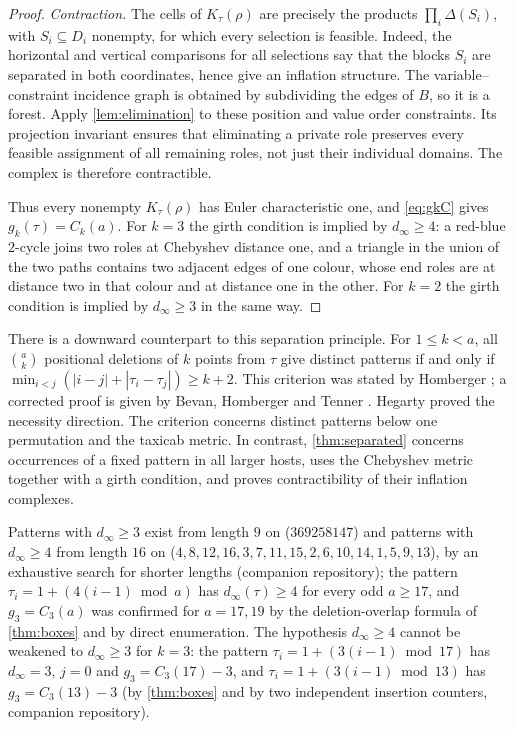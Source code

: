 \documentclass[11pt,reqno]{amsart}
\theoremstyle{plain}
\theoremstyle{definition}
\theoremstyle{remark}
\begin{document}
\begin{proof}
\emph{Contraction.} The cells of $K_\tau(\rho)$ are precisely the
products $\prod_i\Delta(S_i)$, with $S_i\subseteq D_i$ nonempty,
for which every selection is feasible. Indeed, the horizontal and
vertical comparisons for all selections say that the blocks $S_i$
are separated in both coordinates, hence give an inflation structure.
The variable--constraint incidence graph is obtained by subdividing
the edges of $B$, so it is a forest. Apply \cref{lem:elimination} to
these position and value order constraints. Its projection invariant
ensures that eliminating a private role preserves every feasible
assignment of all remaining roles, not just their individual domains.
The complex is therefore contractible.

Thus every nonempty $K_\tau(\rho)$ has Euler characteristic one, and \eqref{eq:gkC} gives $g_k(\tau)=C_k(a)$. For $k=3$ the girth condition is implied by $d_\infty\ge4$: a red-blue $2$-cycle joins two roles at Chebyshev distance one, and a triangle in the union of the two paths contains two adjacent edges of one colour, whose end roles are at distance two in that colour and at distance one in the other. For $k=2$ the girth condition is implied by $d_\infty\ge3$ in the same way.
\end{proof}

There is a downward counterpart to this separation principle.
For $1\le k<a$, all $\binom ak$ positional deletions of $k$ points
from $\tau$ give distinct patterns if and only if
$\min_{i<j}(|i-j|+|\tau_i-\tau_j|)\ge k+2$.
This criterion was stated by Homberger \cite[preprint, Thm.~19]{Homberger2012};
a corrected proof is given by Bevan, Homberger and Tenner
\cite[preprint, Thm.~2.25]{BHT2018}. Hegarty \cite{Hegarty2013} proved the
necessity direction. The criterion concerns distinct patterns below one
permutation and the taxicab metric. In contrast, \cref{thm:separated}
concerns occurrences of a fixed pattern in all larger hosts, uses the
Chebyshev metric together with a girth condition, and proves
contractibility of their inflation complexes.

Patterns with $d_\infty\ge3$ exist from length $9$ on ($369258147$) and patterns with $d_\infty\ge4$ from length $16$ on ($4,8,12,16,3,7,11,15,2,6,10,14,1,5,9,13$), by an exhaustive search for shorter lengths (companion repository); the pattern $\tau_i=1+(4(i-1)\bmod a)$ has $d_\infty(\tau)\ge4$ for every odd $a\ge17$, and $g_3=C_3(a)$ was confirmed for $a=17,19$ by the deletion-overlap formula of \cref{thm:boxes} and by direct enumeration. The hypothesis $d_\infty\ge4$ cannot be weakened to $d_\infty\ge3$ for $k=3$: the pattern $\tau_i=1+(3(i-1)\bmod 17)$ has $d_\infty=3$, $j=0$ and $g_3=C_3(17)-3$, and $\tau_i=1+(3(i-1)\bmod13)$ has $g_3=C_3(13)-3$ (by \cref{thm:boxes} and by two independent insertion counters, companion repository).
\end{document}
